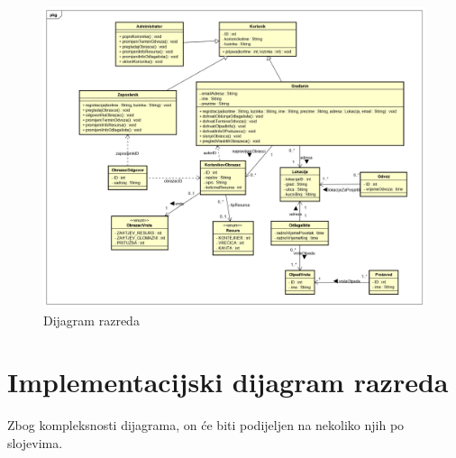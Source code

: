 		
			\begin{figure}[H]
				\includegraphics[width=\linewidth]{dijagrami/Dijagram razreda.png}
				\centering
				\caption{Dijagram razreda}
				\label{fig:dijagram_razreda}
			\end{figure}
			
			
			\eject
			\clearpage
			
		\section{Implementacijski dijagram razreda}
		
		Zbog kompleksnosti dijagrama, on će biti podijeljen na nekoliko njih po slojevima.
		
